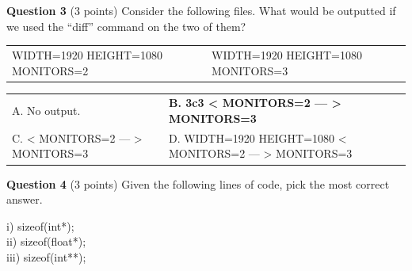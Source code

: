 \documentclass{exam}
\begin{document}
\textbf{Question 3} (3 points) Consider the following files. What would be outputted if we used the “diff” command on the two of them?

\begin{center}
\begin{tabular} { | m{1in} | m{1in} | } 
WIDTH=1920 \newline HEIGHT=1080 \newline MONITORS=2
& 
WIDTH=1920 \newline HEIGHT=1080 \newline MONITORS=3
\end{tabular}
\end{center}

\begin{center}

\begin{tabular} { p{3in}  p{3in} } 
  A.  No output. & \textbf{B. \newline 3c3 \newline < MONITORS=2 \newline --- \newline > MONITORS=3 \newline}\\

  C.  \newline < MONITORS=2 \newline --- \newline > MONITORS=3 & D. \newline WIDTH=1920 \newline HEIGHT=1080 \newline < MONITORS=2 \newline --- \newline > MONITORS=3 \\
\end{tabular}

\end{center}

\vspace{10px}

\textbf{Question 4} (3 points) Given the following lines of code, pick the most correct answer.

\begin{center}
i) sizeof(int*);\\
ii) sizeof(float*);\\
iii) sizeof(int**);\\
\end{center}
\end{document}

